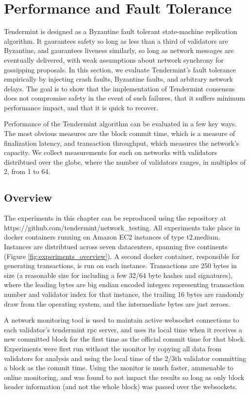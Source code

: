 \chapter{Performance and Fault Tolerance}
\label{ch:performance}

Tendermint is designed as a Byzantine fault tolerant state-machine replication algorithm.
It gaurantees safety so long as less than a third of validators are Byzantine, 
and gaurantees liveness similarly, so long as network messages are eventually delivered,
with weak assumptions about network synchrony for gossipping proposals.
In this section, we evaluate Tendermint's fault tolerance empirically by injecting 
crash faults, Byzantine faults, and arbitrary network delays.
The goal is to show that the implementation of Tendermint consensus does not compromise safety in the event of such failures,
that it suffers minimum performance impact, and that it is quick to recover.

Performance of the Tendermint algorithm can be evaluated in a few key ways.
The most obvious measures are the block commit time, which is a measure of finalization latency, 
and transaction throughput, which measures the network's capacity.
We collect measurements for each on networks with validators distribtued over the globe, 
where the number of validators ranges, in multiples of 2, from 1 to 64.

\section{Overview}

The experiments in this chapter can be reproduced using the repository at https://github.com/tendermint/network\_testing.
All experiments take place in docker containers running on Amazon EC2 instances of type t2.medium.
Instances are distribtued across seven datacenters, spanning five continents (Figure \ref{fig:experiments_overview}).
A second docker container, responsible for generating transactions, is run on each instance.
Transactions are 250 bytes in size (a reasonable size for including a few 32/64 byte hashes and signatures),
where the leading bytes are big endian encoded integers representing transaction number and validator index for that instance,
the trailing 16 bytes are randomly draw from the operating system, and the intermediate bytes are just zeroes.

A network monitoring tool is used to maintain active websocket connections to each validator's tendermint rpc server,
and uses its local time when it receives a new committed block for the first time as the official commit time for that block.
Experiments were first run without the monitor by copying all data from validators for analysis and using the local time
of the 2/3th validator committing a block as the commit time. 
Using the monitor is much faster, ammenable to online monitoring, and was found to not impact the results 
so long as only block header information (and not the whole block) was passed over the websockets.

